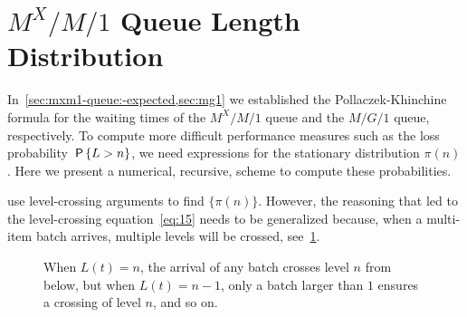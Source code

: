 


\section{$M^X/M/1$ Queue Length Distribution}\label{sec:batch-arrivals}


In~\cref{sec:mxm1-queue:-expected,sec:mg1} we established the Pollaczek-Khinchine formula for the waiting times of the $M^X/M/1$ queue and the $M/G/1$ queue, respectively.
To compute more difficult performance measures such as the loss probability $\,\mathsf{P}\left\{L>n\right\}$, we need expressions for the stationary distribution $\pi(n)$.
Here we present a numerical, recursive, scheme to compute these probabilities.


 use level-crossing arguments to find $\{\pi(n)\}$.
However, the reasoning that led to the level-crossing equation~\cref{eq:15} needs to be generalized because, when a multi-item batch arrives, multiple levels will be crossed, see~\cref{fig:levelcrossing}.


\begin{figure}[ht]
\centering
{}

\caption{When $L(t)=n$, the arrival of any batch crosses level $n$ from below, but when $L(t)=n-1$, only a batch larger than $1$ ensures a crossing of level $n$, and so on.} \label{fig:levelcrossing}
\end{figure}

